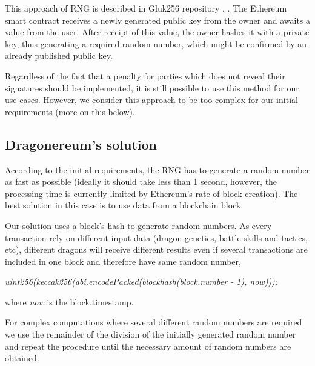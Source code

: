 \documentclass[12pt]{article}
\begin{document}
This approach of RNG is described in Gluk256 repository  \cite{Dao_Casino_Ksenya_Serova_2017_Jun_27},  \cite{Gluk256_2016_Aug_26}. The Ethereum smart contract receives a newly generated public key from the owner and awaits a value from the user. After receipt of this value, the owner hashes it with a private key, thus generating a required random number, which might be confirmed by an already published public key.\par

Regardless of the fact that a penalty for parties which does not reveal their signatures should be implemented, it is still possible to use this method for our use-cases. However, we consider this approach to be too complex for our initial requirements (more on this below).\par

\vspace{\baselineskip}
\subsection{Dragonereum’s solution}
\label{Dragonereums solution}  \par

According to the initial requirements, the RNG has to generate a random number as fast as possible (ideally it should take less than 1 second, however, the processing time is currently limited by Ethereum’s rate of block creation). The best solution in this case is to use data from a blockchain block.\par

Our solution uses a block’s hash to generate random numbers. As every transaction rely on different input data (dragon genetics, battle skills and tactics, etc), different dragons will receive different results even if several transactions are included in one block and therefore have same random number,\par

\begin{Center}
\textit{uint256(keccak256(abi.encodePacked(blockhash(block.number - 1), now)));}
\end{Center}\par

where \textit{ now} is the block.timestamp.\par

For complex computations where several different random numbers are required we use the remainder of the division of the initially generated random number and repeat the procedure until the necessary amount of random numbers are obtained.\par
\end{document}
